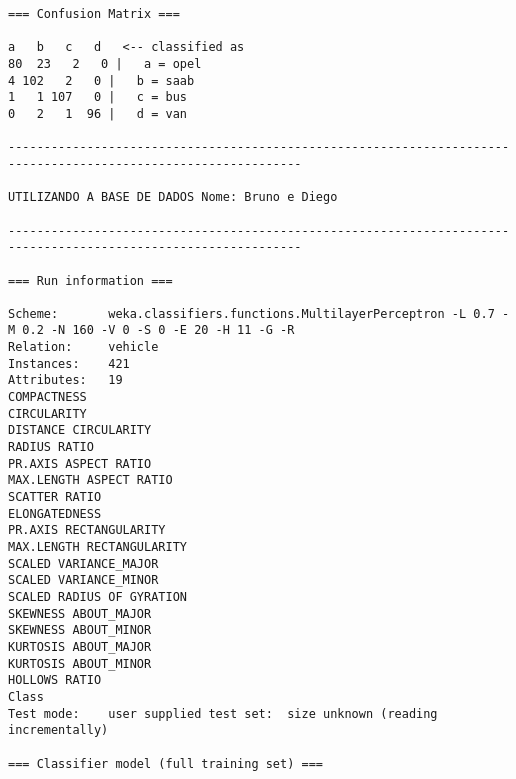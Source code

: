 \documentclass[
	article,			%
	11pt,				%
	oneside,			%
	a4paper,			%
	english,			%
	brazil,				%
	sumario=tradicional
	]{abntex2}
\begin{document}
\begin{lstlisting}
=== Confusion Matrix ===

a   b   c   d   <-- classified as
80  23   2   0 |   a = opel
4 102   2   0 |   b = saab
1   1 107   0 |   c = bus
0   2   1  96 |   d = van

---------------------------------------------------------------------------------------------------------------

UTILIZANDO A BASE DE DADOS Nome: Bruno e Diego

---------------------------------------------------------------------------------------------------------------

=== Run information ===

Scheme:       weka.classifiers.functions.MultilayerPerceptron -L 0.7 -M 0.2 -N 160 -V 0 -S 0 -E 20 -H 11 -G -R
Relation:     vehicle
Instances:    421
Attributes:   19
COMPACTNESS
CIRCULARITY
DISTANCE CIRCULARITY
RADIUS RATIO
PR.AXIS ASPECT RATIO
MAX.LENGTH ASPECT RATIO
SCATTER RATIO
ELONGATEDNESS
PR.AXIS RECTANGULARITY
MAX.LENGTH RECTANGULARITY
SCALED VARIANCE_MAJOR
SCALED VARIANCE_MINOR
SCALED RADIUS OF GYRATION
SKEWNESS ABOUT_MAJOR
SKEWNESS ABOUT_MINOR
KURTOSIS ABOUT_MAJOR
KURTOSIS ABOUT_MINOR
HOLLOWS RATIO
Class
Test mode:    user supplied test set:  size unknown (reading incrementally)

=== Classifier model (full training set) ===


\end{lstlisting}
\end{document}
